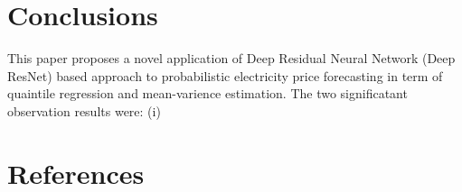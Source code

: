 \documentclass[review]{elsarticle}
\begin{document}
  \section{Conclusions}
    This paper proposes a novel application of Deep Residual Neural Network (Deep ResNet) based approach to probabilistic electricity price forecasting in term of quaintile regression and mean-varience estimation. The two significatant observation results were: (i)
  \section*{References}
  
\end{document}
